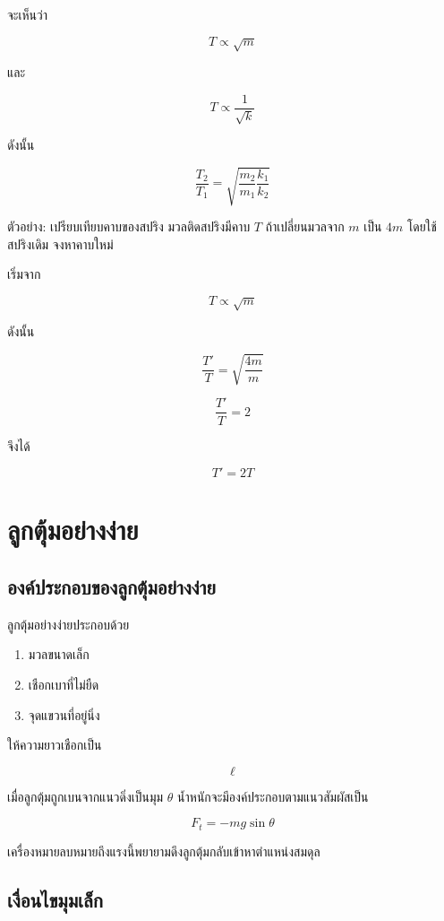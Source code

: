 จะเห็นว่า

\[
T\propto \sqrt{m}
\]

และ

\[
T\propto \frac{1}{\sqrt{k}}
\]

ดังนั้น

\[
\frac{T_2}{T_1}
=
\sqrt{
\frac{m_2}{m_1}
\frac{k_1}{k_2}
}
\]

\begin{examplebox}{ตัวอย่าง: เปรียบเทียบคาบของสปริง}
มวลติดสปริงมีคาบ $T$ ถ้าเปลี่ยนมวลจาก $m$ เป็น $4m$ โดยใช้สปริงเดิม จงหาคาบใหม่

เริ่มจาก

\[
T\propto \sqrt{m}
\]

ดังนั้น

\[
\frac{T'}{T}
=
\sqrt{\frac{4m}{m}}
\]

\[
\frac{T'}{T}=2
\]

จึงได้

\[
\boxed{T'=2T}
\]
\end{examplebox}

\section{ลูกตุ้มอย่างง่าย}

\subsection{องค์ประกอบของลูกตุ้มอย่างง่าย}

ลูกตุ้มอย่างง่ายประกอบด้วย

\begin{enumerate}
    \item มวลขนาดเล็ก
    \item เชือกเบาที่ไม่ยืด
    \item จุดแขวนที่อยู่นิ่ง
\end{enumerate}

ให้ความยาวเชือกเป็น

\[
\ell
\]

เมื่อลูกตุ้มถูกเบนจากแนวดิ่งเป็นมุม $\theta$ น้ำหนักจะมีองค์ประกอบตามแนวสัมผัสเป็น

\[
F_t=-mg\sin\theta
\]

เครื่องหมายลบหมายถึงแรงนี้พยายามดึงลูกตุ้มกลับเข้าหาตำแหน่งสมดุล

\subsection{เงื่อนไขมุมเล็ก}

